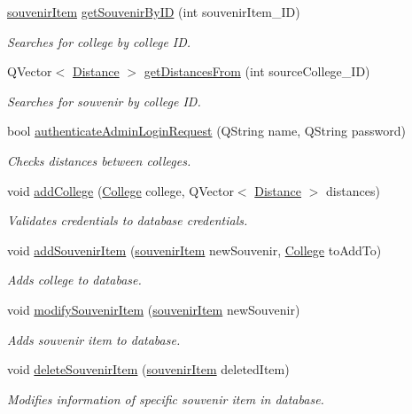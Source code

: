 \begin{DoxyCompactItemize}
\mbox{\hyperlink{structsouvenir_item}{souvenir\+Item}} \mbox{\hyperlink{classdb_manager_a005ba0700501bd4c601a79248607f2b6}{get\+Souvenir\+By\+ID}} (int souvenir\+Item\+\_\+\+ID)
\begin{DoxyCompactList}\small\item\em Searches for college by college ID. \end{DoxyCompactList}\item 
Q\+Vector$<$ \mbox{\hyperlink{struct_distance}{Distance}} $>$ \mbox{\hyperlink{classdb_manager_aaa56ad9c1a84cd0063efa1551b297138}{get\+Distances\+From}} (int source\+College\+\_\+\+ID)
\begin{DoxyCompactList}\small\item\em Searches for souvenir by college ID. \end{DoxyCompactList}\item 
bool \mbox{\hyperlink{classdb_manager_a0ce2c2fa322e30e512165509811544fa}{authenticate\+Admin\+Login\+Request}} (Q\+String name, Q\+String password)
\begin{DoxyCompactList}\small\item\em Checks distances between colleges. \end{DoxyCompactList}\item 
void \mbox{\hyperlink{classdb_manager_ae466201599ce67617d769a1196714bf1}{add\+College}} (\mbox{\hyperlink{struct_college}{College}} college, Q\+Vector$<$ \mbox{\hyperlink{struct_distance}{Distance}} $>$ distances)
\begin{DoxyCompactList}\small\item\em Validates credentials to database credentials. \end{DoxyCompactList}\item 
void \mbox{\hyperlink{classdb_manager_aa52b30e936de3c8c7b561c6d6c6a4cd6}{add\+Souvenir\+Item}} (\mbox{\hyperlink{structsouvenir_item}{souvenir\+Item}} new\+Souvenir, \mbox{\hyperlink{struct_college}{College}} to\+Add\+To)
\begin{DoxyCompactList}\small\item\em Adds college to database. \end{DoxyCompactList}\item 
void \mbox{\hyperlink{classdb_manager_a4d1f437fbf2bed7786324a8dcf639a4a}{modify\+Souvenir\+Item}} (\mbox{\hyperlink{structsouvenir_item}{souvenir\+Item}} new\+Souvenir)
\begin{DoxyCompactList}\small\item\em Adds souvenir item to database. \end{DoxyCompactList}\item 
void \mbox{\hyperlink{classdb_manager_a97da73c78035103e648836dbfb927786}{delete\+Souvenir\+Item}} (\mbox{\hyperlink{structsouvenir_item}{souvenir\+Item}} deleted\+Item)
\begin{DoxyCompactList}\small\item\em Modifies information of specific souvenir item in database. \end{DoxyCompactList}\end{DoxyCompactItemize}

